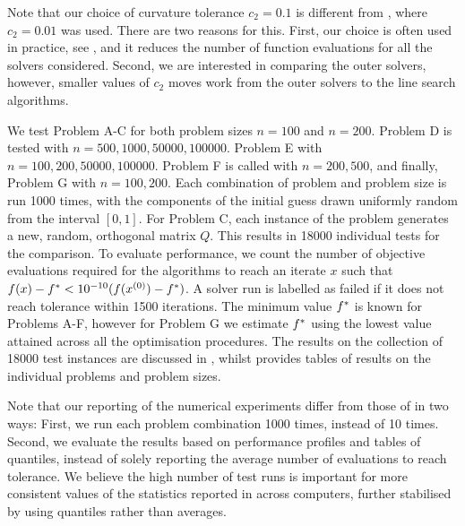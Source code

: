 \documentclass[main.tex]{subfiles}
\begin{document}
Note that our choice of curvature tolerance $c_2=0.1$ is different
from \citet{sterck2013steepest}, where $c_2=0.01$ was used. There are
two reasons for this.  First, our choice is often used in practice,
see \citet[Ch.~3.1]{nocedal2006numerical}, and it reduces the number
of function evaluations for all the solvers considered.  Second, we
are interested in comparing the outer solvers, however, smaller values
of $c_2$ moves work from the outer solvers to the line search
algorithms.

We test Problem A-C for both problem sizes $n=100$ and $n=200$.
Problem D is tested with
$n=\num{500},\num{1000},\num{50000},\num{100000}$.  Problem E with
$n=\num{100},\num{200},\num{50000},\num{100000}$.  Problem F is called
with $n=\num{200},\num{500}$, and finally, Problem G with
$n=\num{100},\num{200}$.  Each combination of problem and problem size
is run \num{1000} times, with the components of the initial guess
drawn uniformly random from the interval $[0,1]$. For Problem C, each
instance of the problem generates a new, random, orthogonal matrix
$Q$.  This results in \num{18000} individual tests for the comparison.
To evaluate performance, we count the number of objective evaluations
required for the algorithms to reach an iterate $x$ such that
$f(x)-f^* < 10^{-10}(f(x^{(0)})-f^*)$. A solver run is
labelled as failed if it does not reach tolerance within \num{1500}
iterations.  The minimum value $f^*$ is known for Problems A-F,
however for Problem G we estimate $f^*$ using the lowest value
attained across all the optimisation procedures.  The results on the
collection of \num{18000} test instances are discussed in
, whilst  provides tables of
results on the individual problems and problem sizes.

Note that our reporting of the numerical experiments differ from those
of \citet{sterck2013steepest} in two ways: First, we run each problem
combination \num{1000} times, instead of \num{10} times. Second, we
evaluate the results based on performance profiles and tables of
quantiles, instead of solely reporting the average number of
evaluations to reach tolerance.  We believe the high number of test
runs is important for more consistent values of the statistics
reported in  across computers, further stabilised by using
quantiles rather than averages.
\end{document}
